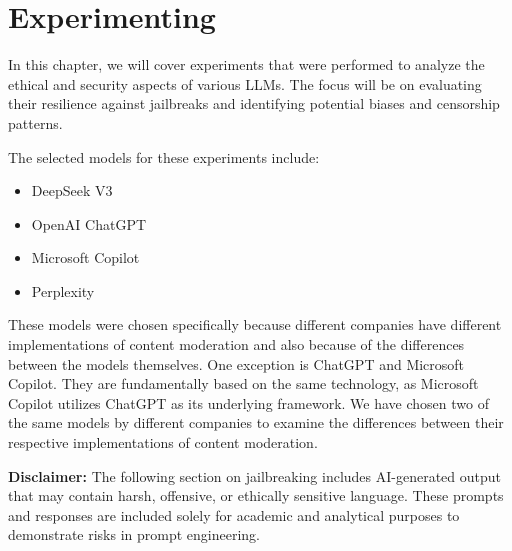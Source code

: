 \chapter{Experimenting}


In this chapter, we will cover experiments that were performed to analyze the ethical and security aspects of various LLMs. The focus will be on evaluating their resilience against jailbreaks and identifying potential biases and censorship patterns.

The selected models for these experiments include:
\begin{itemize}
    \item DeepSeek V3
    \item OpenAI ChatGPT
    \item Microsoft Copilot
    \item Perplexity


    
\end{itemize}

These models were chosen specifically because different companies have different implementations of content moderation and also because of the differences between the models themselves. One exception is ChatGPT and Microsoft Copilot. They are fundamentally based on the same technology, as Microsoft Copilot utilizes ChatGPT as its underlying framework. We have chosen two of the same models by different companies to examine the differences between their respective implementations of content moderation.

\textbf{Disclaimer:} The following section on jailbreaking includes AI-generated output that may contain harsh, offensive, or ethically sensitive language. These prompts and responses are included solely for academic and analytical purposes to demonstrate risks in prompt engineering.


